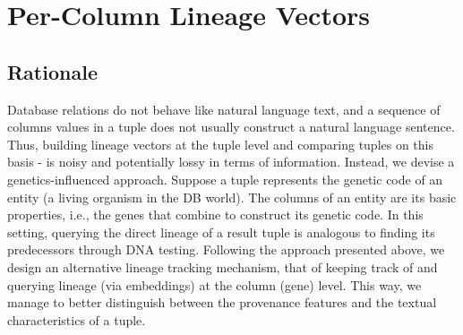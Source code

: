 \chapter{Per-Column Lineage Vectors}
\label{chap:per_column_lineage_vectors}


\section{Rationale} Database relations do not behave like natural language text, and a sequence of columns values in a tuple does not usually construct a natural language sentence. Thus, building lineage vectors at the tuple level and comparing tuples on this basis - is noisy and potentially lossy in terms of information. Instead, we devise a genetics-influenced approach. Suppose a tuple represents the genetic code of an entity (a living organism in the DB world). The columns of an entity are its basic properties, i.e., the genes that combine to construct its genetic code. In this setting, querying the direct lineage of a result tuple is analogous to finding its predecessors through DNA testing. Following the approach presented above, we design an alternative lineage tracking mechanism, that of keeping track of and querying lineage (via embeddings) at the column (gene) level. This way, we manage to better distinguish between the provenance features and the textual characteristics of a tuple.\\ 

